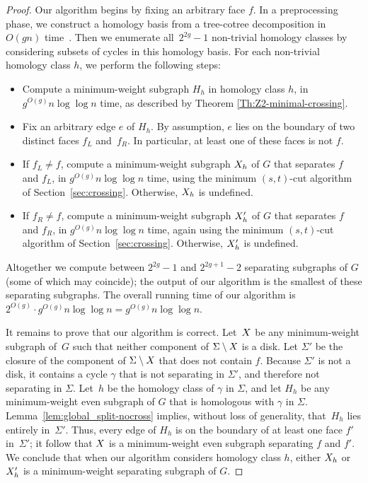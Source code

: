 \documentclass[11pt,twoside]{article}
\begin{document}
{\begin{proof}
Our algorithm begins by fixing an arbitrary face $f$.  In a preprocessing phase, we  construct a homology basis from a tree-cotree decomposition in $O(gn)$ time~\cite{e-dgteg-03}.  Then we enumerate all~$2^{2g}-1$ non-trivial homology classes by considering subsets of cycles in this homology basis.  For each non-trivial homology class $h$, we perform the following steps:
\begin{itemize}
\item
Compute a minimum-weight subgraph $H_h$ in homology class $h$, in $g^{O(g)}n\log\log n$ time, as described by Theorem \ref{Th:Z2-minimal-crossing}.
\item
Fix an arbitrary edge $e$ of $H_h$.  By assumption, $e$ lies on the boundary of two distinct faces $f_L$ and~$f_R$.  In particular, at least one of these faces is not $f$.
\item
If $f_L\ne f$, compute a minimum-weight subgraph $X_h$ of $G$ that separates $f$ and $f_L$, in $g^{O(g)}n\log\log n$ time, using the minimum $(s,t)$-cut algorithm of Section~\ref{sec:crossing}.  Otherwise, $X_h$ is undefined.
\item
If $f_R\ne f$, compute a minimum-weight subgraph $X'_h$ of $G$ that separates $f$ and $f_R$, in $g^{O(g)}n\log\log n$ time, again using the minimum $(s,t)$-cut algorithm of Section~\ref{sec:crossing}.  Otherwise, $X'_h$ is undefined.
\end{itemize}
Altogether we compute between $2^{2g}-1$ and $2^{2g+1}-2$ separating subgraphs of $G$ (some of which may coincide); the output of our algorithm is the smallest of these separating subgraphs.  The overall running time of our algorithm is $2^{O(g)} \cdot g^{O(g)}n\log\log n = g^{O(g)}n\log\log n$.

It remains to prove that our algorithm is correct.  Let~$X$ be any minimum-weight subgraph of~$G$ such that neither component of $\Sigma \setminus X$ is a disk.  Let $\Sigma'$ be the closure of the component of $\Sigma \setminus X$ that does not contain $f$.  Because $\Sigma'$ is not a disk, it contains a cycle $\gamma$ that is not separating in $\Sigma'$, and therefore not separating in $\Sigma$.  Let~$h$ be the homology class of $\gamma$ in $\Sigma$, and let $H_h$ be any minimum-weight even subgraph of $G$ that is homologous with $\gamma$ in $\Sigma$.  Lemma~\ref{lem:global_split-nocross} implies, without loss of generality, that~$H_h$ lies entirely in~$\Sigma'$.  Thus, every edge of $H_h$ is on the boundary of at least one face $f'$ in~$\Sigma'$; it follow that $X$ is a minimum-weight even subgraph separating $f$ and $f'$.  We conclude that when our algorithm considers homology class $h$, either $X_h$ or $X'_h$ is a minimum-weight separating subgraph of $G$.
\end{proof}

}
\end{document}
